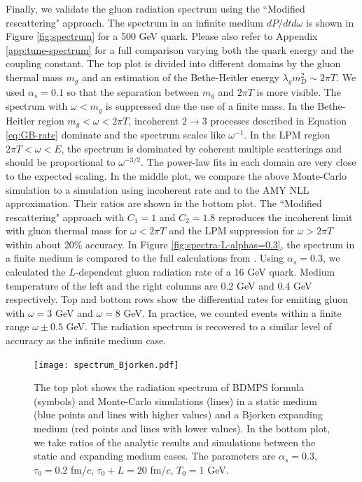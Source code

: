 \documentclass[aps, prc, reprint, amsmath, groupedaddress, nofootinbib]{revtex4-1}
\begin{document}
{Finally, we validate the gluon radiation spectrum using the ``Modified rescattering" approach. 
The spectrum in an infinite medium $dP/dtd\omega$ is shown in Figure \ref{fig:spectrum} for a 500 GeV quark.
Please also refer to Appendix \ref{app:tune-spectrum} for a full comparison varying both the quark energy and the coupling constant.
The top plot is divided into different domains by the gluon thermal mass $m_g$ and an estimation of the Bethe-Heitler energy $\lambda_g m_D^2 \sim 2\pi T$.
We used $\alpha_s = 0.1$ so that the separation between $m_g$ and $2\pi T$ is more visible.
The spectrum with $\omega < m_g$ is suppressed due the use of a finite mass.
In the Bethe-Heitler region $m_g < \omega < 2\pi T$, incoherent $2\rightarrow 3$ processes described in Equation \ref{eq:GB-rate} dominate and the spectrum scales like $\omega^{-1}$.
In the LPM region $2\pi T < \omega < E$, the spectrum is dominated by coherent multiple scatterings and should be proportional to $\omega^{-3/2}$.
The power-law fits in each domain are very close to the expected scaling.
In the middle plot, we compare the above Monte-Carlo simulation to a simulation using incoherent rate and to the AMY NLL approximation. 
Their ratios are shown in the bottom plot.
The ``Modified rescattering" approach with $C_1 = 1$ and $C_2 = 1.8$ reproduces the incoherent limit with gluon thermal mass for $\omega < 2\pi T$ and the LPM suppression for $\omega > 2\pi T$ within about 20\% accuracy.
In Figure \ref{fig:spectra-L-alphas=0.3}, the spectrum in a finite medium is compared to the full calculations from \cite{CaronHuot:2008uh}.
Using $\alpha_s = 0.3$, we calculated the $L$-dependent gluon radiation rate of a 16 GeV quark.
Medium temperature of the left and the right columns are 0.2 GeV and 0.4 GeV respectively.
Top and bottom rows show the differential rates for emiiting gluon with $\omega = 3$ GeV and $\omega = 8$ GeV. 
In practice, we counted events within a finite range $\omega\pm 0.5$ GeV.
The radiation spectrum is recovered to a similar level of accuracy as the infinite medium case.

\begin{figure}
\texttt{[image: spectrum\_Bjorken.pdf]}
\caption{The top plot shows the radiation spectrum of BDMPS formula (symbols) and Monte-Carlo simulations (lines) in a static medium (blue points and lines with higher values) and a Bjorken expanding medium (red points and lines with lower values). In the bottom plot, we take ratios of the analytic results and simulations between the static and expanding medium cases. The parameters are $\alpha_s=0.3$, $\tau_0 = 0.2$ fm/$c$, $\tau_0+L = 20$ fm/$c$, $T_0 = 1$ GeV.}
\label{fig:Bjorken-BDMPS}
\end{figure}

}
\end{document}
